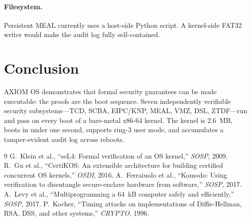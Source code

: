 \documentclass[10pt,twocolumn]{article}
\begin{document}
\paragraph{Filesystem.} Persistent MEAL currently uses a host-side
Python script. A kernel-side FAT32 writer would make the audit log
fully self-contained.

\section{Conclusion}

AXIOM OS demonstrates that formal security guarantees can be made
executable: the proofs are the boot sequence. Seven independently
verifiable security subsystems---TCD, SCBA, EIPC/KNP, MEAL, VMZ, DSL,
ZTDF---run and pass on every boot of a bare-metal x86-64 kernel.
The kernel is 2.6~MB, boots in under one second, supports ring-3 user
mode, and accumulates a tamper-evident audit log across reboots.


\begin{thebibliography}{9}
  G.~Klein et al.,
  ``seL4: Formal verification of an OS kernel,''
  \emph{SOSP}, 2009.
  R.~Gu et al.,
  ``CertiKOS: An extensible architecture for building certified concurrent OS kernels,''
  \emph{OSDI}, 2016.
  A.~Ferraiuolo et al.,
  ``Komodo: Using verification to disentangle secure-enclave hardware from software,''
  \emph{SOSP}, 2017.
  A.~Levy et al.,
  ``Multiprogramming a 64~kB computer safely and efficiently,''
  \emph{SOSP}, 2017.
  P.~Kocher,
  ``Timing attacks on implementations of Diffie-Hellman, RSA, DSS, and other systems,''
  \emph{CRYPTO}, 1996.
\end{thebibliography}
\end{document}
